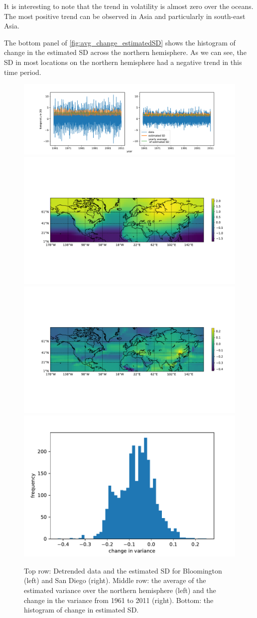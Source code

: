 \documentclass{article}
\begin{document}
It is interesting to note that the trend in volatility is almost zero over the oceans. The most positive trend can be observed in Asia and particularly in south-east Asia.

The bottom panel of \autoref{fig:avg_change_estimatedSD} shows the histogram of change in the estimated SD across the northern hemisphere. As we can see, the SD in most locations on the northern hemisphere had a negative trend in this time period. 

\begin{figure}[tb]
  \centering
  \includegraphics[width=.9 \columnwidth]{Figures/ts_estimatedVar}\\
  \includegraphics[width=.45\linewidth]{Figures/avg_logVar.pdf}
  \includegraphics[width=.45\linewidth]{Figures/avg_change_logVar.pdf}\\
    \includegraphics[width=.3\linewidth]{Figures/hist_avg_change.pdf}
  \caption{Top row: Detrended data and the estimated SD for
    Bloomington (left) and San Diego (right). Middle row: the
    average of the estimated variance over the northern hemisphere (left) and the
    change in the variance from 1961 to 2011 (right). Bottom: the histogram of change in estimated SD.} 
  \label{fig:avg_change_estimatedSD}
\end{figure} 
\end{document}
